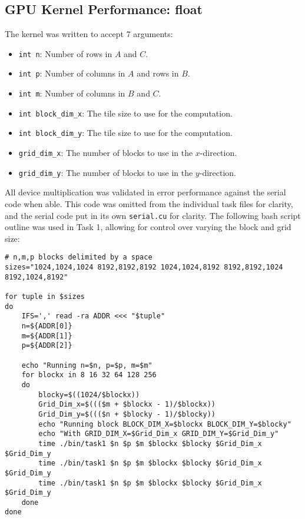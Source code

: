\documentclass{article}
\begin{document}
\subsection{GPU Kernel Performance: float}
The kernel was written to accept $7$ arguments: 
\begin{multicols}{2}
    \begin{itemize}
        \item \texttt{int n}: Number of rows in $A$ and $C$.
        \item \texttt{int p}: Number of columns in $A$ and rows in $B$.
        \item \texttt{int m}: Number of columns in $B$ and $C$.
        \item \texttt{int block\_dim\_x}: The tile size to use for the computation.
        \item \texttt{int block\_dim\_y}: The tile size to use for the computation.
        \item \texttt{grid\_dim\_x}: The number of blocks to use in the $x$-direction.
        \item \texttt{grid\_dim\_y}: The number of blocks to use in the $y$-direction.
    \end{itemize}
\end{multicols}
\noindent All device multiplication was validated in error performance against the serial 
code when able. This code was omitted from the individual task files for clarity, 
and the serial code put in its own \texttt{serial.cu} for clarity.
The following bash script outline was used in Task 1, allowing 
for control over varying the block and grid size:
\newpage
\begin{lstlisting}
# n,m,p blocks delimited by a space
sizes="1024,1024,1024 8192,8192,8192 1024,1024,8192 8192,8192,1024 8192,1024,8192"

for tuple in $sizes
do
    IFS=',' read -ra ADDR <<< "$tuple"
    n=${ADDR[0]}
    m=${ADDR[1]}
    p=${ADDR[2]}

    echo "Running n=$n, p=$p, m=$m"
    for blockx in 8 16 32 64 128 256
    do
        blocky=$((1024/$blockx))
        Grid_Dim_x=$((($m + $blockx - 1)/$blockx))
        Grid_Dim_y=$((($n + $blocky - 1)/$blocky))
        echo "Running block BLOCK_DIM_X=$blockx BLOCK_DIM_Y=$blocky"
        echo "With GRID_DIM_X=$Grid_Dim_x GRID_DIM_Y=$Grid_Dim_y"
        time ./bin/task1 $n $p $m $blockx $blocky $Grid_Dim_x $Grid_Dim_y
        time ./bin/task1 $n $p $m $blockx $blocky $Grid_Dim_x $Grid_Dim_y
        time ./bin/task1 $n $p $m $blockx $blocky $Grid_Dim_x $Grid_Dim_y
    done
done
\end{lstlisting}
\end{document}
